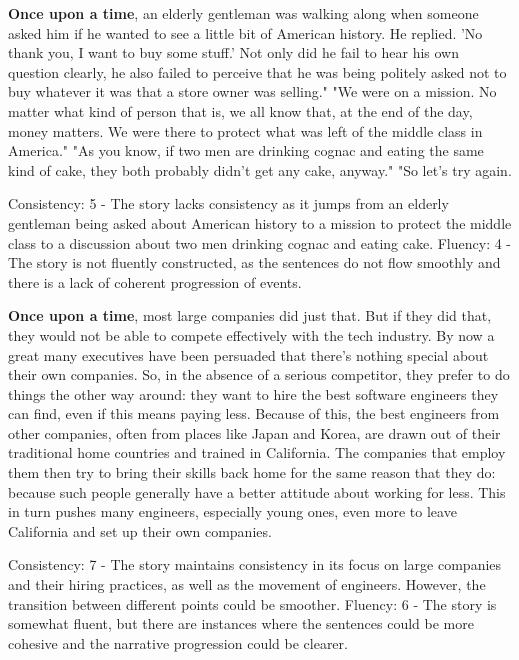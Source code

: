\documentclass{article}
\begin{document}
\textbf{Once upon a time}, an elderly gentleman was walking along when someone asked him if he wanted to see a little bit of American history. He replied. 'No thank you, I want to buy some stuff.' Not only did he fail to hear his own question clearly, he also failed to perceive that he was being politely asked not to buy whatever it was that a store owner was selling." "We were on a mission. No matter what kind of person that is, we all know that, at the end of the day, money matters. We were there to protect what was left of the middle class in America." "As you know, if two men are drinking cognac and eating the same kind of cake, they both probably didn't get any cake, anyway." "So let's try again.

Consistency: 5 - The story lacks consistency as it jumps from an elderly gentleman being asked about American history to a mission to protect the middle class to a discussion about two men drinking cognac and eating cake.
Fluency: 4 - The story is not fluently constructed, as the sentences do not flow smoothly and there is a lack of coherent progression of events.

\textbf{Once upon a time}, most large companies did just that. But if they did that, they would not be able to compete effectively with the tech industry. By now a great many executives have been persuaded that there's nothing special about their own companies. So, in the absence of a serious competitor, they prefer to do things the other way around: they want to hire the best software engineers they can find, even if this means paying less. Because of this, the best engineers from other companies, often from places like Japan and Korea, are drawn out of their traditional home countries and trained in California. The companies that employ them then try to bring their skills back home for the same reason that they do: because such people generally have a better attitude about working for less. This in turn pushes many engineers, especially young ones, even more to leave California and set up their own companies.

Consistency: 7 - The story maintains consistency in its focus on large companies and their hiring practices, as well as the movement of engineers. However, the transition between different points could be smoother.
Fluency: 6 - The story is somewhat fluent, but there are instances where the sentences could be more cohesive and the narrative progression could be clearer.
\end{document}
